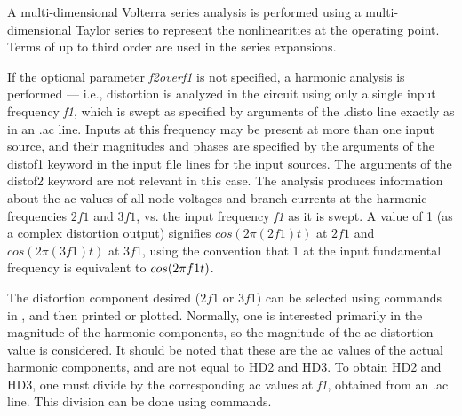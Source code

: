 
A multi-dimensional Volterra series analysis is performed using a
multi-dimensional Taylor series to represent the nonlinearities at the
operating point.  Terms of up to third order are used in the series
expansions.

If the optional parameter {\it f2overf1\/} is not specified, a
harmonic analysis is performed --- i.e., distortion is analyzed in the
circuit using only a single input frequency {\it f1}, which is swept
as specified by arguments of the {\vt .disto} line exactly as in an
{\vt .ac} line.  Inputs at this frequency may be present at more than
one input source, and their magnitudes and phases are specified by the
arguments of the {\vt distof1} keyword in the input file lines for the
input sources.  The arguments of the {\vt distof2} keyword are not
relevant in this case.  The analysis produces information about the ac
values of all node voltages and branch currents at the harmonic
frequencies $2f1$ and $3f1$, vs.  the input frequency {\it f1} as it
is swept.  A value of 1 (as a complex distortion output) signifies
$cos(2\pi(2f1)t)$ at $2f1$ and $cos(2\pi(3f1)t)$ at $3f1$, using the
convention that 1 at the input fundamental frequency is equivalent to
$cos(2\pi\/f1\/t)$.

The distortion component desired ($2f1$ or $3f1$) can be selected
using commands in {\WRspice}, and then printed or plotted.  Normally,
one is interested primarily in the magnitude of the harmonic
components, so the magnitude of the ac distortion value is considered. 
It should be noted that these are the ac values of the actual harmonic
components, and are not equal to HD2 and HD3.  To obtain HD2 and HD3,
one must divide by the corresponding ac values at {\it f1}, obtained
from an {\vt .ac} line.  This division can be done using {\WRspice}
commands.

